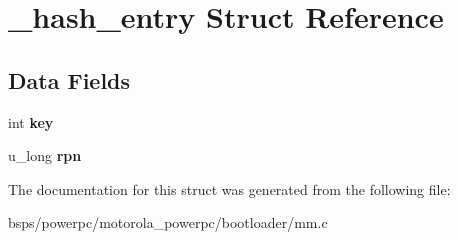 \hypertarget{struct__hash__entry}{}\section{\+\_\+hash\+\_\+entry Struct Reference}
\label{struct__hash__entry}
\subsection*{Data Fields}
\begin{DoxyCompactItemize}
\item 
\mbox{\label{struct__hash__entry_ad50a719e69f304bd7eebf2c67f930f20}} 
int {\bfseries key}
\item 
\mbox{\label{struct__hash__entry_ae6e20c070574978b23df6d1cf5f61e47}} 
u\+\_\+long {\bfseries rpn}
\end{DoxyCompactItemize}


The documentation for this struct was generated from the following file\+:\begin{DoxyCompactItemize}
\item 
bsps/powerpc/motorola\+\_\+powerpc/bootloader/mm.\+c\end{DoxyCompactItemize}

